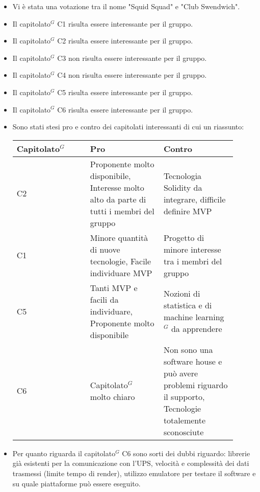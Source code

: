 \begin{itemize}
    \item Vi è stata una votazione tra il nome "Squid Squad" e "Club Swendwich".
    \item Il capitolato$^{G}$ C1 risulta essere interessante per il gruppo.
    \item Il capitolato$^{G}$ C2 risulta essere interessante per il gruppo.
    \item Il capitolato$^{G}$ C3 non risulta essere interessante per il gruppo.
    \item Il capitolato$^{G}$ C4 non risulta essere interessante per il gruppo.
    \item Il capitolato$^{G}$ C5 risulta essere interessante per il gruppo.
    \item Il capitolato$^{G}$ C6 risulta essere interessante per il gruppo.
    \item Sono stati stesi pro e contro dei capitolati interessanti di cui un riassunto: \\
        \begin{tabular}{|p{0.30\linewidth} |p{0.30\linewidth} |p{0.30 \linewidth}|}
        \hline
        Capitolato$^{G}$ & Pro & Contro                                                                                                                                             \\
        \hline
        C2         & Proponente molto disponibile, Interesse molto alto da parte di tutti i membri del gruppo & Tecnologia Solidity da integrare, difficile definire MVP \\
        \hline
        C1         & Minore quantità di nuove tecnologie, Facile individuare MVP & Progetto di minore interesse tra i membri del gruppo \\
        \hline
        C5         & Tanti MVP e facili da individuare, Proponente molto disponibile & Nozioni di statistica e di machine learning$^{G}$ da apprendere \\
        \hline
        C6         & Capitolato$^{G}$ molto chiaro & Non sono una software house e può avere problemi riguardo il supporto, Tecnologie totalemente sconosciute \\
        \hline
        \end{tabular}
    \item Per quanto riguarda il capitolato$^{G}$ C6 sono sorti dei dubbi riguardo: librerie già esistenti per la comunicazione con l'UPS, velocità e complessità dei dati trasmessi (limite tempo di render), utilizzo emulatore per testare il software e su quale piattaforme può essere eseguito.

\end{itemize}
